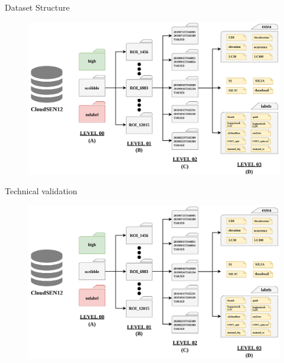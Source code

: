 \begin{frame}{Dataset Structure}
	\begin{center}
		\begin{figure}
			\includegraphics[width=0.8\linewidth]{images/figure10.png}
		\end{figure}
	\end{center}
\end{frame}



\begin{frame}{Technical validation}
	\begin{center}
		\begin{figure}
			\includegraphics[width=0.6\linewidth]{images/figure10.png}
		\end{figure}
	\end{center}
\end{frame}

